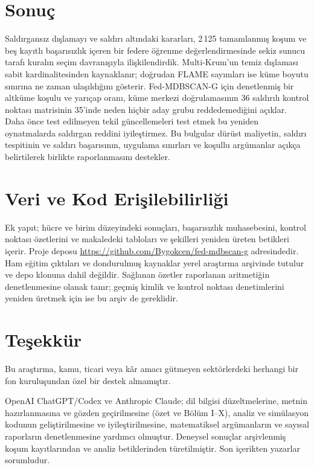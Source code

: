 \documentclass[journal]{IEEEtran}
\newcommand{\method}{Fed-MDBSCAN-G}
\begin{document}
\section{Sonuç}\label{sec:conclusion}
Saldırgansız dışlamayı ve saldırı altındaki kararları, 2\,125 tamamlanmış koşum ve beş kayıtlı başarısızlık içeren bir federe öğrenme değerlendirmesinde sekiz sunucu tarafı kuralın seçim davranışıyla ilişkilendirdik. Multi-Krum'un temiz dışlaması sabit kardinalitesinden kaynaklanır; doğrudan FLAME sayımları ise küme boyutu sınırına ne zaman ulaşıldığını gösterir. \method{} için denetlenmiş bir altküme koşulu ve yarıçap oranı, küme merkezi doğrulamasının 36 saldırılı kontrol noktası matrisinin 35'inde neden hiçbir aday grubu reddedemediğini açıklar. Daha önce test edilmeyen tekil güncellemeleri test etmek bu yeniden oynatmalarda saldırgan reddini iyileştirmez. Bu bulgular dürüst maliyetin, saldırı tespitinin ve saldırı başarısının, uygulama sınırları ve koşullu argümanlar açıkça belirtilerek birlikte raporlanmasını destekler.

\section*{Veri ve Kod Erişilebilirliği}
Ek yapıt; hücre ve birim düzeyindeki sonuçları, başarısızlık muhasebesini, kontrol noktası özetlerini ve makaledeki tabloları ve şekilleri yeniden üreten betikleri içerir. Proje deposu \url{https://github.com/Bygokcen/fed-mdbscan-g} adresindedir. Ham eğitim çıktıları ve dondurulmuş kaynaklar yerel araştırma arşivinde tutulur ve depo klonuna dahil değildir. Sağlanan özetler raporlanan aritmetiğin denetlenmesine olanak tanır; geçmiş kimlik ve kontrol noktası denetimlerini yeniden üretmek için ise bu arşiv de gereklidir.

\section*{Teşekkür}
Bu araştırma, kamu, ticari veya kâr amacı gütmeyen sektörlerdeki herhangi bir fon kuruluşundan özel bir destek almamıştır.

OpenAI ChatGPT/Codex ve Anthropic Claude; dil bilgisi düzeltmelerine, metnin hazırlanmasına ve gözden geçirilmesine (özet ve Bölüm I--X), analiz ve simülasyon kodunun geliştirilmesine ve iyileştirilmesine, matematiksel argümanların ve sayısal raporların denetlenmesine yardımcı olmuştur. Deneysel sonuçlar arşivlenmiş koşum kayıtlarından ve analiz betiklerinden türetilmiştir. Son içerikten yazarlar sorumludur.
\end{document}
